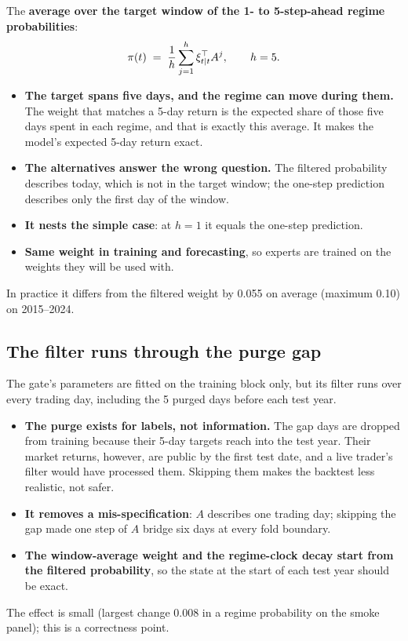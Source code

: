 The \textbf{average over the target window of the 1- to 5-step-ahead regime
probabilities}:
\begin{equation}
\pi(t) \;=\; \frac{1}{h}\sum_{j=1}^{h}\xi_{t\mid t}^{\top} A^{j}, \qquad h=5 .
\end{equation}

\begin{whybox}
\begin{itemize}
\item \textbf{The target spans five days, and the regime can move during them.} The weight that matches a
  5-day return is the expected share of those five days spent in each regime, and that is exactly this
  average. It makes the model's expected 5-day return exact.
\item \textbf{The alternatives answer the wrong question.} The filtered probability describes today, which is
  not in the target window; the one-step prediction describes only the first day of the window.
\item \textbf{It nests the simple case}: at $h=1$ it equals the one-step prediction.
\item \textbf{Same weight in training and forecasting}, so experts are trained on the weights they will be used
  with.
\end{itemize}
In practice it differs from the filtered weight by 0.055 on average (maximum 0.10) on 2015--2024.
\end{whybox}

\subsection{The filter runs through the purge gap}

 The gate's parameters are fitted on the training block only, but its filter runs over
every trading day, including the 5 purged days before each test year. 

\begin{whybox}
\begin{itemize}
\item \textbf{The purge exists for labels, not information.} The gap days are dropped from training because
  their 5-day targets reach into the test year. Their market returns, however, are public by the first test
  date, and a live trader's filter would have processed them. Skipping them makes the backtest less
  realistic, not safer.
\item \textbf{It removes a mis-specification}: $A$ describes one trading day; skipping the gap made one step of
  $A$ bridge six days at every fold boundary.
\item \textbf{The window-average weight and the regime-clock decay start from the filtered probability}, so the
  state at the start of each test year should be exact.
\end{itemize}
The effect is small (largest change 0.008 in a regime probability on the smoke panel); this is a correctness
point.
\end{whybox}


